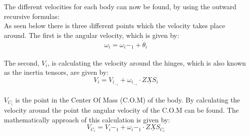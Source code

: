 The different velocities for each body can now be found, by using the outward recursive formulas:\\
As seen below there is three different points which the velocity takes place around. The first is the angular velocity, which is given by:\\
\begin{equation}\label{eq:W}
\omega_i=\omega_i-_1+\dot\theta_i
\end{equation}\\
The second, \(V_i\), is calculating the velocity around the hinges, which is also known as the inertia tensors, are given by:\\
\begin{equation}\label{eq:Vi}
V_i=V_i_-_1+\omega_i_-_1\cdot Z\underline{X}S_i
\end{equation}\\
 \(V_C_i\) is the point in the Center Of Mass (C.O.M) of the body. By calculating the velocity around the point the angular velocity of the C.O.M can be found. The mathematically approach of this calculation is given by:\\
\begin{equation}\label{eq:Vci}
V_C_i=V_i-_1+\omega_i-_1\cdot Z\underline{X}S_C_i
\end{equation}

